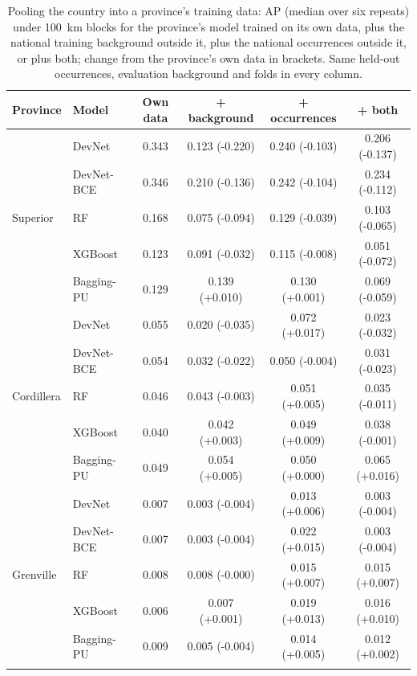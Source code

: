 \documentclass[pdflatex,sn-apa]{sn-jnl}
\begin{document}
\begin{table}[t]
\caption{Pooling the country into a province's training data: AP (median over six repeats) under 100~km blocks for the province's model trained on its own data, plus the national training background outside it, plus the national occurrences outside it, or plus both; change from the province's own data in brackets. Same held-out occurrences, evaluation background and folds in every column.}\label{tab:nat-pooling}
\scriptsize
\setlength{\tabcolsep}{2.5pt}
\begin{tabular*}{\textwidth}{@{\extracolsep\fill}llcccc}
\toprule
Province & Model & Own data & + background & + occurrences & + both \\
\midrule
\multirow{5}{*}{Superior} & DevNet & 0.343 & 0.123 (-0.220) & 0.240 (-0.103) & 0.206 (-0.137) \\
 & DevNet-BCE & 0.346 & 0.210 (-0.136) & 0.242 (-0.104) & 0.234 (-0.112) \\
 & RF & 0.168 & 0.075 (-0.094) & 0.129 (-0.039) & 0.103 (-0.065) \\
 & XGBoost & 0.123 & 0.091 (-0.032) & 0.115 (-0.008) & 0.051 (-0.072) \\
 & Bagging-PU & 0.129 & 0.139 (+0.010) & 0.130 (+0.001) & 0.069 (-0.059) \\
\midrule
\multirow{5}{*}{Cordillera} & DevNet & 0.055 & 0.020 (-0.035) & 0.072 (+0.017) & 0.023 (-0.032) \\
 & DevNet-BCE & 0.054 & 0.032 (-0.022) & 0.050 (-0.004) & 0.031 (-0.023) \\
 & RF & 0.046 & 0.043 (-0.003) & 0.051 (+0.005) & 0.035 (-0.011) \\
 & XGBoost & 0.040 & 0.042 (+0.003) & 0.049 (+0.009) & 0.038 (-0.001) \\
 & Bagging-PU & 0.049 & 0.054 (+0.005) & 0.050 (+0.000) & 0.065 (+0.016) \\
\midrule
\multirow{5}{*}{Grenville} & DevNet & 0.007 & 0.003 (-0.004) & 0.013 (+0.006) & 0.003 (-0.004) \\
 & DevNet-BCE & 0.007 & 0.003 (-0.004) & 0.022 (+0.015) & 0.003 (-0.004) \\
 & RF & 0.008 & 0.008 (-0.000) & 0.015 (+0.007) & 0.015 (+0.007) \\
 & XGBoost & 0.006 & 0.007 (+0.001) & 0.019 (+0.013) & 0.016 (+0.010) \\
 & Bagging-PU & 0.009 & 0.005 (-0.004) & 0.014 (+0.005) & 0.012 (+0.002) \\
\botrule
\end{tabular*}
\end{table}
\end{document}

